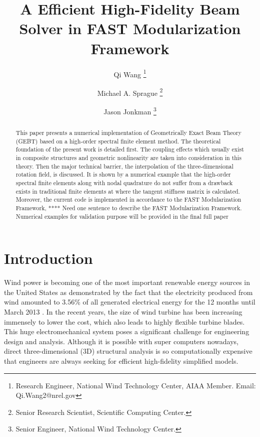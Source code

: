 \documentclass{aiaa-tc}
\title{A Efficient High-Fidelity Beam Solver in FAST Modularization Framework}
\author[1]{Qi Wang  \thanks{Research Engineer, National Wind Technology Center, AIAA Member. Email: Qi.Wang2@nrel.gov}}
\author[1]{Michael A. Sprague \thanks{Senior Research Scientist, Scientific Computing Center.}}
\author[1]{Jason Jonkman \thanks{Senior Engineer, National Wind Technology Center.}}
\affil[1]{National Renewable Energy Laboratory, Golden, CO 80401-3305}
\renewcommand{\kill}[1]{\textcolor{red}{\sout{#1}}}
\begin{document}
\maketitle

\begin{abstract}
{ This paper presents a numerical implementation of Geometrically Exact Beam Theory (GEBT) based on a high-order spectral finite element method. The theoretical foundation of the present work is detailed first. The coupling effects which usually exist in composite structures  and geometric nonlinearity are taken into consideration in this theory. Then the major technical barrier, the interpolation of the three-dimensional rotation field, is discussed. It is shown by a numerical example that the high-order spectral finite elements along with nodal quadrature do not suffer from a drawback exists in traditional finite elements at where the tangent stiffness matrix is calculated. Moreover, the current code is implemented in accordance to the FAST Modularization Framework, **** {\color{red}  Need one sentence to describe the FAST Modularization Framework}. Numerical examples for validation purpose will be provided in the final full paper}     
\end{abstract}



\section{Introduction}
Wind power is becoming one of the most important renewable energy sources in the United States as demonstrated by the fact that the electricity produced from wind amounted to 3.56\% of all generated electrical energy for the 12 months until March 2013 \cite{WindWiki}. In the recent years, the size of wind turbine has been increasing immensely to lower the cost, which also leads to highly flexible turbine blades. This huge electromechanical system poses a significant challenge for engineering design and analysis. Although it is possible with super computers nowadays, direct three-dimensional (3D) structural analysis is so computationally expensive that engineers are always seeking for efficient high-fidelity simplified models.
\end{document}
